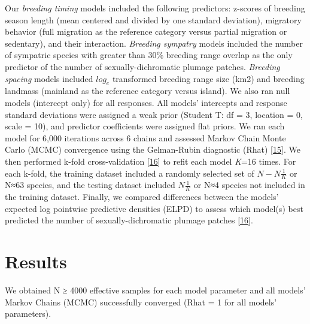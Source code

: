 Our \emph{breeding timing} models included the following predictors:
z-scores of breeding season length (mean centered and divided by one
standard deviation), migratory behavior (full migration as the reference
category versus partial migration or sedentary), and their interaction.
\emph{Breeding sympatry} models included the number of sympatric species
with greater than 30\% breeding range overlap as the only predictor of
the number of sexually-dichromatic plumage patches. \emph{Breeding
spacing} models included \(log_{e}\) transformed breeding range size
(km2) and breeding landmass (mainland as the reference category versus
island). We also ran null models (intercept only) for all responses. All
models' intercepts and response standard deviations were assigned a weak
prior (Student T: df = 3, location = 0, scale = 10), and predictor
coefficients were assigned flat priors. We ran each model for 6,000
iterations across 6 chains and assessed Markov Chain Monte Carlo (MCMC)
convergence using the Gelman-Rubin diagnostic (Rhat)
{[}\protect\hyperlink{ref-gelmanBayesianDataAnalysis2013}{15}{]}. We
then performed k-fold cross-validation
{[}\protect\hyperlink{ref-vehtariPracticalBayesianModel2017}{16}{]} to
refit each model \emph{K}=16 times. For each k-fold, the training
dataset included a randomly selected set of \(N- N\frac{1}{K}\) or N≈63
species, and the testing dataset included \(N\frac{1}{K}\) or N≈4
species not included in the training dataset. Finally, we compared
differences between the models' expected log pointwise predictive
densities (ELPD) to assess which model(s) best predicted the number of
sexually-dichromatic plumage patches
{[}\protect\hyperlink{ref-vehtariPracticalBayesianModel2017}{16}{]}⁠.

\hypertarget{results}{%
\section{Results}\label{results}}

We obtained N ≥ 4000 effective samples for each model parameter and all
models' Markov Chains (MCMC) successfully converged (Rhat = 1 for all
models' parameters).

